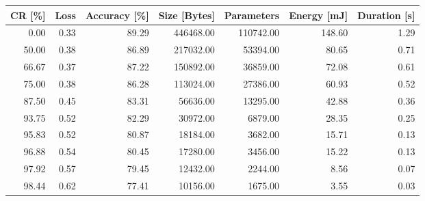 \begin{tabular}{rrrrrrr}
\toprule
    CR [\%] &       Loss & Accuracy [\%] & Size [Bytes] & Parameters & Energy [mJ] & Duration [s] \\
\midrule
      0.00 &       0.33 &        89.29 &    446468.00 &  110742.00 &      148.60 &         1.29 \\
     50.00 &       0.38 &        86.89 &    217032.00 &   53394.00 &       80.65 &         0.71 \\
     66.67 &       0.37 &        87.22 &    150892.00 &   36859.00 &       72.08 &         0.61 \\
     75.00 &       0.38 &        86.28 &    113024.00 &   27386.00 &       60.93 &         0.52 \\
     87.50 &       0.45 &        83.31 &     56636.00 &   13295.00 &       42.88 &         0.36 \\
     93.75 &       0.52 &        82.29 &     30972.00 &    6879.00 &       28.35 &         0.25 \\
     95.83 &       0.52 &        80.87 &     18184.00 &    3682.00 &       15.71 &         0.13 \\
     96.88 &       0.54 &        80.45 &     17280.00 &    3456.00 &       15.22 &         0.13 \\
     97.92 &       0.57 &        79.45 &     12432.00 &    2244.00 &        8.56 &         0.07 \\
     98.44 &       0.62 &        77.41 &     10156.00 &    1675.00 &        3.55 &         0.03 \\
\bottomrule
\end{tabular}
